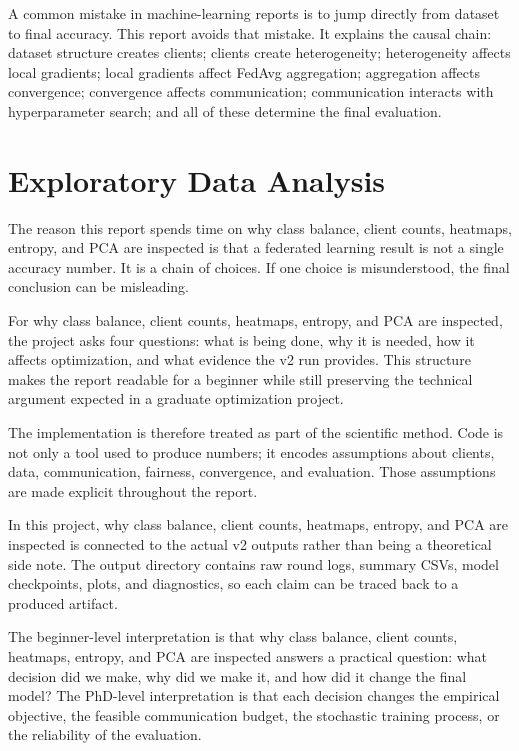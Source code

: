 \documentclass[11pt]{report}
\begin{document}
A common mistake in machine-learning reports is to jump directly from dataset to final accuracy.
This report avoids that mistake. It explains the causal chain: dataset structure creates clients;
clients create heterogeneity; heterogeneity affects local gradients; local gradients affect FedAvg
aggregation; aggregation affects convergence; convergence affects communication; communication
interacts with hyperparameter search; and all of these determine the final evaluation.

\chapter{Exploratory Data Analysis}
The reason this report spends time on why class balance, client counts, heatmaps, entropy, and PCA
are inspected is that a federated learning result is not a single accuracy number. It is a chain of
choices. If one choice is misunderstood, the final conclusion can be misleading.

For why class balance, client counts, heatmaps, entropy, and PCA are inspected, the project asks
four questions: what is being done, why it is needed, how it affects optimization, and what evidence
the v2 run provides. This structure makes the report readable for a beginner while still preserving
the technical argument expected in a graduate optimization project.

The implementation is therefore treated as part of the scientific method. Code is not only a tool
used to produce numbers; it encodes assumptions about clients, data, communication, fairness,
convergence, and evaluation. Those assumptions are made explicit throughout the report.

In this project, why class balance, client counts, heatmaps, entropy, and PCA are inspected is
connected to the actual v2 outputs rather than being a theoretical side note. The output directory
contains raw round logs, summary CSVs, model checkpoints, plots, and diagnostics, so each claim can
be traced back to a produced artifact.

The beginner-level interpretation is that why class balance, client counts, heatmaps, entropy, and
PCA are inspected answers a practical question: what decision did we make, why did we make it, and
how did it change the final model? The PhD-level interpretation is that each decision changes the
empirical objective, the feasible communication budget, the stochastic training process, or the
reliability of the evaluation.
\end{document}
